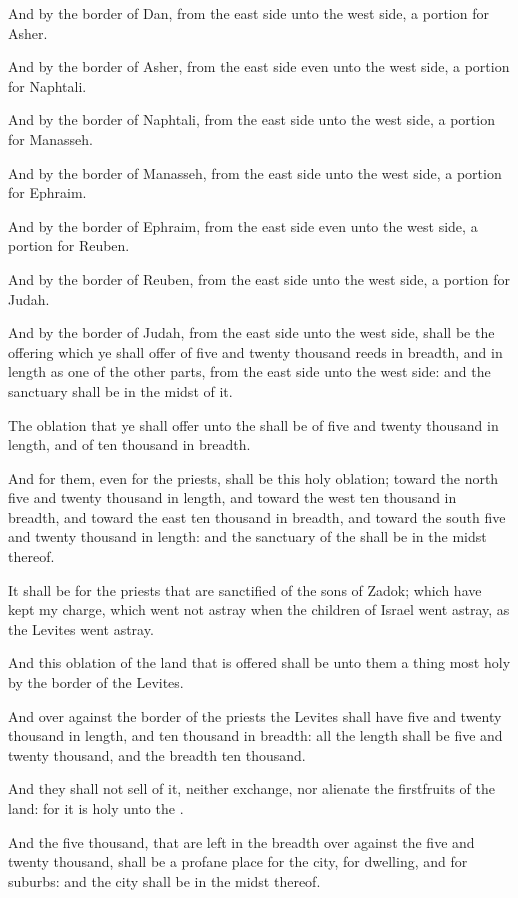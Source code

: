 \verse And by the border of Dan, from the east side unto the west side, a portion for Asher.

\verse And by the border of Asher, from the east side even unto the west side, a portion for Naphtali.

\verse And by the border of Naphtali, from the east side unto the west side, a portion for Manasseh.

\verse And by the border of Manasseh, from the east side unto the west side, a portion for Ephraim.

\verse And by the border of Ephraim, from the east side even unto the west side, a portion for Reuben.

\verse And by the border of Reuben, from the east side unto the west side, a portion for Judah.

\verse And by the border of Judah, from the east side unto the west side, shall be the offering which ye shall offer of five and twenty thousand reeds in breadth, and in length as one of the other parts, from the east side unto the west side: and the sanctuary shall be in the midst of it.

\verse The oblation that ye shall offer unto the \LORD shall be of five and twenty thousand in length, and of ten thousand in breadth.

\verse And for them, even for the priests, shall be this holy oblation; toward the north five and twenty thousand in length, and toward the west ten thousand in breadth, and toward the east ten thousand in breadth, and toward the south five and twenty thousand in length: and the sanctuary of the \LORD shall be in the midst thereof.

\verse It shall be for the priests that are sanctified of the sons of Zadok; which have kept my charge, which went not astray when the children of Israel went astray, as the Levites went astray.

\verse And this oblation of the land that is offered shall be unto them a thing most holy by the border of the Levites.

\verse And over against the border of the priests the Levites shall have five and twenty thousand in length, and ten thousand in breadth: all the length shall be five and twenty thousand, and the breadth ten thousand.

\verse And they shall not sell of it, neither exchange, nor alienate the firstfruits of the land: for it is holy unto the \LORD.

\verse And the five thousand, that are left in the breadth over against the five and twenty thousand, shall be a profane place for the city, for dwelling, and for suburbs: and the city shall be in the midst thereof.

